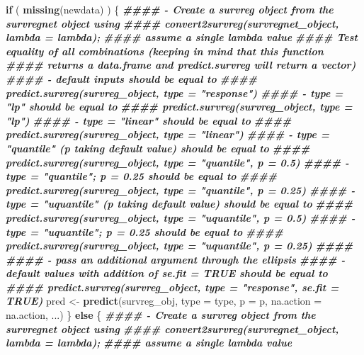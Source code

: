 \documentclass[
]{book}
\newenvironment{Shaded}{\begin{snugshade}}{\end{snugshade}}
\newcommand{\AttributeTok}[1]{\textcolor[rgb]{0.13,0.29,0.53}{#1}}
\newcommand{\ControlFlowTok}[1]{\textcolor[rgb]{0.13,0.29,0.53}{\textbf{#1}}}
\newcommand{\DocumentationTok}[1]{\textcolor[rgb]{0.56,0.35,0.01}{\textbf{\textit{#1}}}}
\newcommand{\FunctionTok}[1]{\textcolor[rgb]{0.13,0.29,0.53}{\textbf{#1}}}
\newcommand{\NormalTok}[1]{#1}
\newcommand{\OtherTok}[1]{\textcolor[rgb]{0.56,0.35,0.01}{#1}}
\begin{document}
\begin{Shaded}
\begin{Highlighting}[]
  \ControlFlowTok{if}\NormalTok{ ( }\FunctionTok{missing}\NormalTok{(newdata) ) \{}
    \DocumentationTok{\#\#\#\# {-} Create a survreg object from the survregnet object using }
    \DocumentationTok{\#\#\#\#   convert2survreg(survregnet\_object, lambda = lambda); }
    \DocumentationTok{\#\#\#\#   assume a single lambda value}
    \DocumentationTok{\#\#\#\#   Test equality of all combinations (keeping in mind that this function}
    \DocumentationTok{\#\#\#\#    returns a data.frame and predict.survreg will return a vector)}
    \DocumentationTok{\#\#\#\#   {-} default inputs should be equal to}
    \DocumentationTok{\#\#\#\#     predict.survreg(survreg\_object, type = "response")}
    \DocumentationTok{\#\#\#\#   {-} type = "lp" should be equal to}
    \DocumentationTok{\#\#\#\#     predict.survreg(survreg\_object, type = "lp")}
    \DocumentationTok{\#\#\#\#   {-} type = "linear" should be equal to}
    \DocumentationTok{\#\#\#\#     predict.survreg(survreg\_object, type = "linear")}
    \DocumentationTok{\#\#\#\#   {-} type = "quantile" (p taking default value) should be equal to}
    \DocumentationTok{\#\#\#\#     predict.survreg(survreg\_object, type = "quantile", p = 0.5)}
    \DocumentationTok{\#\#\#\#   {-} type = "quantile"; p = 0.25 should be equal to}
    \DocumentationTok{\#\#\#\#     predict.survreg(survreg\_object, type = "quantile", p = 0.25)}
    \DocumentationTok{\#\#\#\#   {-} type = "uquantile" (p taking default value) should be equal to}
    \DocumentationTok{\#\#\#\#     predict.survreg(survreg\_object, type = "uquantile", p = 0.5)}
    \DocumentationTok{\#\#\#\#   {-} type = "uquantile"; p = 0.25 should be equal to}
    \DocumentationTok{\#\#\#\#     predict.survreg(survreg\_object, type = "uquantile", p = 0.25)}
    \DocumentationTok{\#\#\#\#}
    \DocumentationTok{\#\#\#\# {-} pass an additional argument through the ellipsis}
    \DocumentationTok{\#\#\#\#   {-} default values with addition of se.fit = TRUE should be equal to}
    \DocumentationTok{\#\#\#\#   predict.survreg(survreg\_object, type = "response", se.fit = TRUE)}
\NormalTok{    pred }\OtherTok{\textless{}{-}} \FunctionTok{predict}\NormalTok{(survreg\_obj, }\AttributeTok{type =}\NormalTok{ type, }\AttributeTok{p =}\NormalTok{ p, }\AttributeTok{na.action =}\NormalTok{ na.action, ...)}
\NormalTok{  \} }\ControlFlowTok{else}\NormalTok{ \{}
    \DocumentationTok{\#\#\#\# {-} Create a survreg object from the survregnet object using }
    \DocumentationTok{\#\#\#\#   convert2survreg(survregnet\_object, lambda = lambda); }
    \DocumentationTok{\#\#\#\#   assume a single lambda value}

\end{Highlighting}
\end{Shaded}
\end{document}
